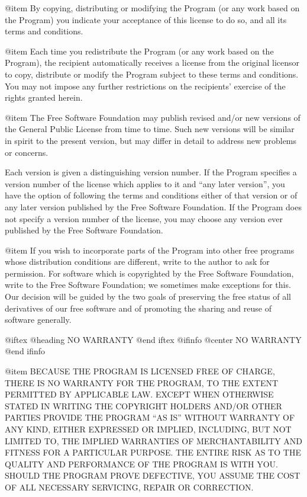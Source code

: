 @item
By copying, distributing or modifying the Program (or any work based
on the Program) you indicate your acceptance of this license to do so,
and all its terms and conditions.

@item
Each time you redistribute the Program (or any work based on the
Program), the recipient automatically receives a license from the original
licensor to copy, distribute or modify the Program subject to these
terms and conditions.  You may not impose any further restrictions on the
recipients' exercise of the rights granted herein.

@item
The Free Software Foundation may publish revised and/or new versions
of the General Public License from time to time.  Such new versions will
be similar in spirit to the present version, but may differ in detail to
address new problems or concerns.

Each version is given a distinguishing version number.  If the Program
specifies a version number of the license which applies to it and ``any
later version'', you have the option of following the terms and conditions
either of that version or of any later version published by the Free
Software Foundation.  If the Program does not specify a version number of
the license, you may choose any version ever published by the Free Software
Foundation.

@item
If you wish to incorporate parts of the Program into other free
programs whose distribution conditions are different, write to the author
to ask for permission.  For software which is copyrighted by the Free
Software Foundation, write to the Free Software Foundation; we sometimes
make exceptions for this.  Our decision will be guided by the two goals
of preserving the free status of all derivatives of our free software and
of promoting the sharing and reuse of software generally.

@iftex
@heading NO WARRANTY
@end iftex
@ifinfo
@center NO WARRANTY
@end ifinfo

@item
BECAUSE THE PROGRAM IS LICENSED FREE OF CHARGE, THERE IS NO WARRANTY
FOR THE PROGRAM, TO THE EXTENT PERMITTED BY APPLICABLE LAW.  EXCEPT WHEN
OTHERWISE STATED IN WRITING THE COPYRIGHT HOLDERS AND/OR OTHER PARTIES
PROVIDE THE PROGRAM ``AS IS'' WITHOUT WARRANTY OF ANY KIND, EITHER EXPRESSED
OR IMPLIED, INCLUDING, BUT NOT LIMITED TO, THE IMPLIED WARRANTIES OF
MERCHANTABILITY AND FITNESS FOR A PARTICULAR PURPOSE.  THE ENTIRE RISK AS
TO THE QUALITY AND PERFORMANCE OF THE PROGRAM IS WITH YOU.  SHOULD THE
PROGRAM PROVE DEFECTIVE, YOU ASSUME THE COST OF ALL NECESSARY SERVICING,
REPAIR OR CORRECTION.

